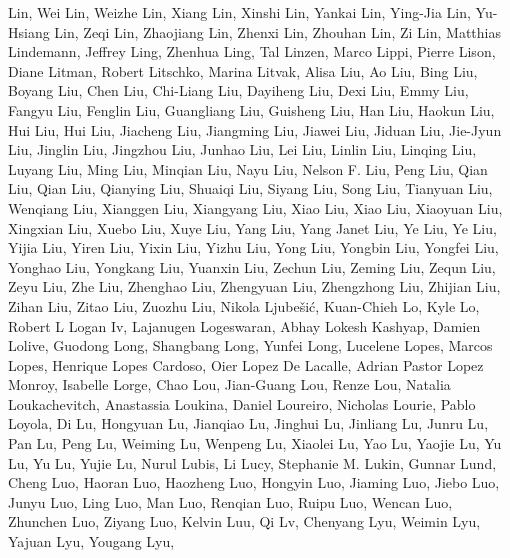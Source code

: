 Lin, Wei Lin, Weizhe Lin, Xiang Lin, Xinshi Lin, Yankai Lin, Ying-Jia Lin, Yu-Hsiang Lin, Zeqi Lin, Zhaojiang Lin, Zhenxi Lin, Zhouhan Lin, Zi Lin, Matthias Lindemann, Jeffrey Ling, Zhenhua Ling, Tal Linzen, Marco Lippi, Pierre Lison, Diane Litman, Robert Litschko, Marina Litvak, Alisa Liu, Ao Liu, Bing Liu, Boyang Liu, Chen Liu, Chi-Liang Liu, Dayiheng Liu, Dexi Liu, Emmy Liu, Fangyu Liu, Fenglin Liu, Guangliang Liu, Guisheng Liu, Han Liu, Haokun Liu, Hui Liu, Hui Liu, Jiacheng Liu, Jiangming Liu, Jiawei Liu, Jiduan Liu, Jie-Jyun Liu, Jinglin Liu, Jingzhou Liu, Junhao Liu, Lei Liu, Linlin Liu, Linqing Liu, Luyang Liu, Ming Liu, Minqian Liu, Nayu Liu, Nelson F. Liu, Peng Liu, Qian Liu, Qian Liu, Qianying Liu, Shuaiqi Liu, Siyang Liu, Song Liu, Tianyuan Liu, Wenqiang Liu, Xianggen Liu, Xiangyang Liu, Xiao Liu, Xiao Liu, Xiaoyuan Liu, Xingxian Liu, Xuebo Liu, Xuye Liu, Yang Liu, Yang Janet Liu, Ye Liu, Ye Liu, Yijia Liu, Yiren Liu, Yixin Liu, Yizhu Liu, Yong Liu, Yongbin Liu, Yongfei Liu, Yonghao Liu, Yongkang Liu, Yuanxin Liu, Zechun Liu, Zeming Liu, Zequn Liu, Zeyu Liu, Zhe Liu, Zhenghao Liu, Zhengyuan Liu, Zhengzhong Liu, Zhijian Liu, Zihan Liu, Zitao Liu, Zuozhu Liu, Nikola Ljubešić, Kuan-Chieh Lo, Kyle Lo, Robert L Logan Iv, Lajanugen Logeswaran, Abhay Lokesh Kashyap, Damien Lolive, Guodong Long, Shangbang Long, Yunfei Long, Lucelene Lopes, Marcos Lopes, Henrique Lopes Cardoso, Oier Lopez De Lacalle, Adrian Pastor Lopez Monroy, Isabelle Lorge, Chao Lou, Jian-Guang Lou, Renze Lou, Natalia Loukachevitch, Anastassia Loukina, Daniel Loureiro, Nicholas Lourie, Pablo Loyola, Di Lu, Hongyuan Lu, Jianqiao Lu, Jinghui Lu, Jinliang Lu, Junru Lu, Pan Lu, Peng Lu, Weiming Lu, Wenpeng Lu, Xiaolei Lu, Yao Lu, Yaojie Lu, Yu Lu, Yu Lu, Yujie Lu, Nurul Lubis, Li Lucy, Stephanie M. Lukin, Gunnar Lund, Cheng Luo, Haoran Luo, Haozheng Luo, Hongyin Luo, Jiaming Luo, Jiebo Luo, Junyu Luo, Ling Luo, Man Luo, Renqian Luo, Ruipu Luo, Wencan Luo, Zhunchen Luo, Ziyang Luo, Kelvin Luu, Qi Lv, Chenyang Lyu, Weimin Lyu, Yajuan Lyu, Yougang Lyu,
